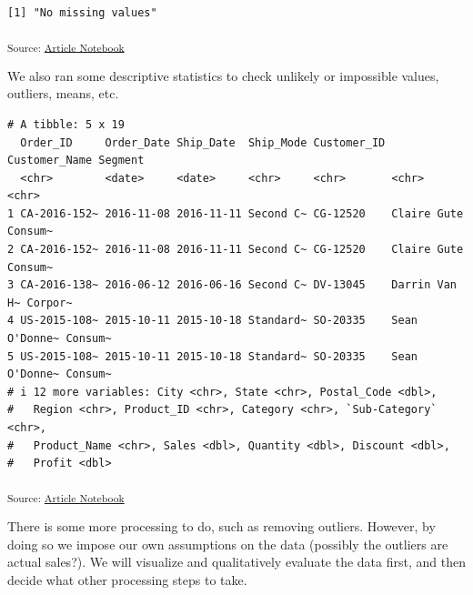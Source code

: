 \documentclass[
]{agujournal2019}
\begin{document}
\begin{verbatim}
[1] "No missing values"
\end{verbatim}

\textsubscript{Source:
\href{https://SJbrou.github.io/Supply_Chain_Data_Analysis/index.qmd.html}{Article
Notebook}}

We also ran some descriptive statistics to check unlikely or impossible
values, outliers, means, etc.

\begin{verbatim}
# A tibble: 5 x 19
  Order_ID     Order_Date Ship_Date  Ship_Mode Customer_ID Customer_Name Segment
  <chr>        <date>     <date>     <chr>     <chr>       <chr>         <chr>  
1 CA-2016-152~ 2016-11-08 2016-11-11 Second C~ CG-12520    Claire Gute   Consum~
2 CA-2016-152~ 2016-11-08 2016-11-11 Second C~ CG-12520    Claire Gute   Consum~
3 CA-2016-138~ 2016-06-12 2016-06-16 Second C~ DV-13045    Darrin Van H~ Corpor~
4 US-2015-108~ 2015-10-11 2015-10-18 Standard~ SO-20335    Sean O'Donne~ Consum~
5 US-2015-108~ 2015-10-11 2015-10-18 Standard~ SO-20335    Sean O'Donne~ Consum~
# i 12 more variables: City <chr>, State <chr>, Postal_Code <dbl>,
#   Region <chr>, Product_ID <chr>, Category <chr>, `Sub-Category` <chr>,
#   Product_Name <chr>, Sales <dbl>, Quantity <dbl>, Discount <dbl>,
#   Profit <dbl>
\end{verbatim}

\textsubscript{Source:
\href{https://SJbrou.github.io/Supply_Chain_Data_Analysis/index.qmd.html}{Article
Notebook}}

There is some more processing to do, such as removing outliers. However,
by doing so we impose our own assumptions on the data (possibly the
outliers are actual sales?). We will visualize and qualitatively
evaluate the data first, and then decide what other processing steps to
take.
\end{document}
